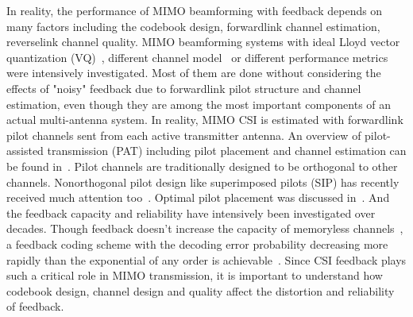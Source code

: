 \documentclass[10pt,fleqn, twocolumn]{IEEEtran}
\begin{document}
In reality, the performance of MIMO beamforming with feedback
depends on many factors including the codebook design, forwardlink
channel estimation, reverselink channel quality. MIMO beamforming
systems with ideal Lloyd vector quantization (VQ)~\cite{Narula98},
different channel model~\cite{Mukka03} or different performance
metrics~\cite{PXia04,Roh04} were intensively investigated. Most of
them are done without considering the effects of "noisy" feedback
due to forwardlink pilot structure and channel estimation, even
though they are among the most important components of an actual
multi-antenna system. In reality, MIMO CSI is estimated with
forwardlink pilot channels sent from each active transmitter
antenna. An overview of pilot-assisted transmission (PAT)
including pilot placement and channel estimation can be found
in~\cite{Tong04}. Pilot channels are traditionally designed to be
orthogonal to other channels. Nonorthogonal pilot design like
superimposed pilots (SIP) has recently received much attention
too~\cite{Coldrey06}. Optimal pilot placement was discussed
in~\cite{Dong02}. And the feedback capacity and reliability have
intensively been investigated over decades. Though feedback
doesn't increase the capacity of memoryless
channels~\cite{Shannon56,Kim06}, a feedback coding scheme with the
decoding error probability decreasing more rapidly than the
exponential of any order is achievable~\cite{Kramer69}. Since CSI
feedback plays such a critical role in MIMO transmission, it is
important to understand how codebook design, channel design and
quality affect the distortion and reliability of feedback.
\end{document}
